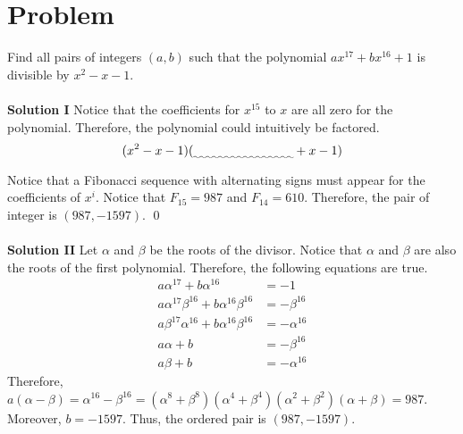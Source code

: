 \documentclass{article}
\begin{document}
\section*{Problem}
Find all pairs of integers $(a, b)$ such that the polynomial $ax^{17} + bx^{16} + 1$ is divisible by $x^2 - x - 1$.
\\\\
\textbf{Solution I}
Notice that the coefficients for $x^{15}$ to $x$ are all zero for the polynomial. Therefore, the polynomial could intuitively be factored.
\[
(x^2 - x - 1)(\uwave{\qquad\qquad\qquad\qquad} + x - 1)
\]
Notice that a Fibonacci sequence with alternating signs must appear for the coefficients of $x^i$. Notice that $F_{15} = 987$ and $F_{14} = 610$. Therefore, the pair of integer is $\boxed{(987, -1597)}$.
\qed
\\\\
\textbf{Solution II}
Let $\alpha$ and $\beta$ be the roots of the divisor. Notice that $\alpha$ and $\beta$ are also the roots of the first polynomial. Therefore, the following equations are true.
\begin{align*}
    a\alpha^{17} + b\alpha^{16} &= -1 \\
    a\alpha^{17}\beta^{16} + b\alpha^{16}\beta^{16} &= -\beta^{16} \\
    a\beta^{17}\alpha^{16} + b\alpha^{16}\beta^{16} &= -\alpha^{16} \\
    a\alpha + b &= -\beta^{16} \\
    a\beta + b &= -\alpha^{16}
\end{align*}
Therefore, $a(\alpha - \beta) = \alpha^{16} - \beta^{16} = (\alpha^8 + \beta^8)(\alpha^4 + \beta^4)(\alpha^2 + \beta^2)(\alpha + \beta) = 987$. Moreover, $b = -1597$. Thus, the ordered pair is $\boxed{(987, -1597)}$.
\end{document}
